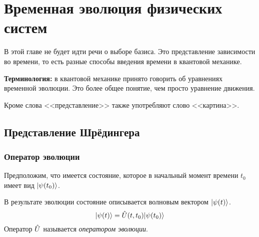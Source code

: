 \chapter{Временная эволюция физических систем}

В этой главе не будет идти речи о выборе базиса. Это представление зависимости во времени, то есть разные способы введения времени в квантовой механике.

\textbf{Терминология:}
в квантовой механике принято говорить об уравнениях временной эволюции. Это более общее понятие, чем просто уравнение движения.

Кроме слова <<представление>> также употребляют слово <<картина>>.

\section{Представление Шрёдингера}
\subsection{Оператор эволюции}
\Def Предположим, что имеется состояние, которое в начальный момент времени $t_0$ имеет вид $| \psi(t_0) \rangle$.

В результате эволюции состояние описывается волновым вектором $| \psi(t) \rangle$.
$$
    | \psi(t) \rangle = \hat U (t, t_0) | \psi(t_0) \rangle
$$
\Def Оператор $\Hat U$ называется \emph{оператором эволюции}.

